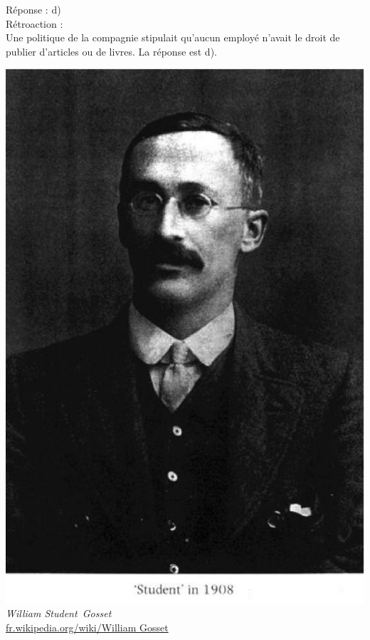 \documentclass[letterpaper, 12pt]{article}
\begin{document}
R\'eponse : d)\\

R\'etroaction :\\
Une politique de la compagnie stipulait qu'aucun employ\'e n'avait le droit de publier d'articles ou de livres. La r\'eponse est d).
\begin{center}
\includegraphics[scale=0.15]{Student.eps}\\
\emph{{\small William \og Student\fg \ Gosset}}\\
\href{http://fr.wikipedia.org/wiki/William_Gosset}{fr.wikipedia.org/wiki/William Gosset}\\[5mm]
\end{center}
\end{document}
